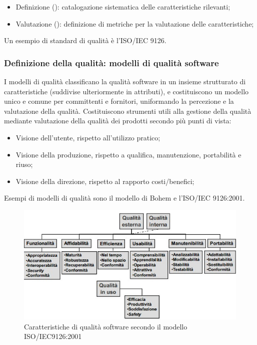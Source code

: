 \begin{itemize}
	\item Definizione (): catalogazione sistematica delle caratteristiche rilevanti;
	\item Valutazione (): definizione di metriche per la valutazione delle caratteristiche;
\end{itemize}

Un esempio di standard di qualità è l'ISO/IEC 9126.

\subsubsection{Definizione della qualità: modelli di qualità software}
I modelli di qualità classificano la qualità software in un insieme strutturato di caratteristiche (suddivise ulteriormente in attributi), e costituiscono un modello unico e comune per committenti e fornitori, uniformando la percezione e la valutazione della qualità. Costituiscono strumenti utili alla gestione della qualità mediante valutazione della qualità dei prodotti secondo più punti di vista:

\begin{itemize}
	\item Visione dell'utente, rispetto all'utilizzo pratico;
	\item Visione della produzione, rispetto a qualifica, manutenzione, portabilità e riuso;
	\item Visione della direzione, rispetto al rapporto costi/benefici;
\end{itemize}

Esempi di modelli di qualità sono il modello di Bohem e l'ISO/IEC 9126:2001.

\begin{figure}[h]
	\centering
	\includegraphics[scale=0.6]{imgs/isoiec_9126_2001.jpg}
	\caption{Caratteristiche di qualità software secondo il modello ISO/IEC9126:2001}
\end{figure}


